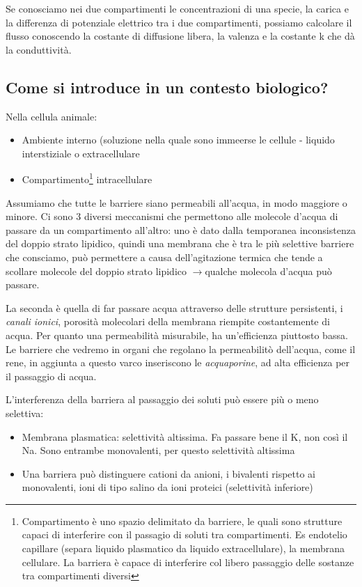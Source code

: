 \documentclass[a4paper,12pt]{article}
\newcommand{\lfreccia}{\ensuremath{\longrightarrow}}
\begin{document}
Se conosciamo nei due compartimenti le concentrazioni di una specie, la carica e la differenza di  potenziale elettrico tra i due compartimenti, possiamo calcolare il flusso conoscendo la costante di diffusione libera, la valenza e la costante k che dà la conduttività.

\subsection{Come si introduce in un contesto biologico?}

Nella cellula animale:

\begin{itemize}
\item{Ambiente interno (soluzione nella quale sono immeerse le cellule - liquido interstiziale o extracellulare}
\item{Compartimento\footnote{Compartimento è uno spazio delimitato da barriere, le quali sono strutture capaci di interferire con il passagio di soluti tra compartimenti. Es endotelio capillare (separa liquido plasmatico da liquido extracellulare), la membrana cellulare. La barriera è capace di interferire col libero passaggio delle sostanze tra compartimenti diversi} intracellulare}
\end{itemize} 


Assumiamo che tutte le barriere siano permeabili all'acqua, in modo maggiore o minore. Ci sono 3 diversi meccanismi che permettono alle molecole d'acqua di passare da un compartimento all'altro: uno è dato dalla temporanea inconsistenza del doppio strato lipidico, quindi una membrana che è tra le più selettive barriere che consciamo, può permettere a causa dell'agitazione termica che tende a scollare molecole del doppio strato lipidico \lfreccia qualche  molecola d'acqua può passare. 

La seconda è quella di far passare acqua attraverso delle strutture persistenti, i \emph{canali ionici}, porosità molecolari della membrana riempite costantemente di acqua. Per quanto una permeabilità misurabile, ha un'efficienza piuttosto bassa. Le barriere che vedremo in organi che regolano la permeabilitò dell'acqua, come il rene, in aggiunta a questo varco inseriscono le \emph{acquaporine}, ad alta efficienza per il passaggio di acqua.
 

L'interferenza della barriera al passaggio dei soluti può essere più o meno selettiva:
\begin{itemize}
\item{Membrana plasmatica: selettività altissima. Fa passare bene il K, non così il Na. Sono entrambe monovalenti, per questo selettività altissima}
\item{Una barriera può distinguere cationi da anioni, i bivalenti rispetto ai monovalenti, ioni di tipo salino da ioni proteici (selettività inferiore)}
\end{itemize}
\end{document}
